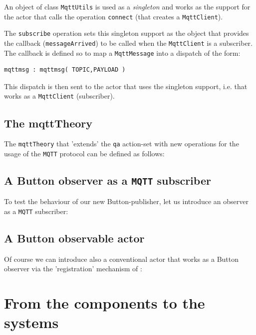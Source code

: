 

An object of class \texttt{MqttUtils} is used as a \textit{singleton} and works as the support for the actor that calls the operation \texttt{connect} (that creates a \texttt{MqttClient}).

The \texttt{subscribe} operation sets this singleton support as the object that provides the callback (\texttt{messageArrived}) to be called when the \texttt{MqttClient} is a subscriber. The callback is defined so to map a \texttt{MqttMessage} into a dispatch of the form:

\begin{Verbatim}[fontsize=\scriptsize, frame=single]
mqttmsg : mqttmsg( TOPIC,PAYLOAD )
\end{Verbatim}

This dispatch is then sent to the actor that uses the singleton support, i.e. that works as a \texttt{MqttClient} (subscriber).

\subsection{The mqttTheory}
The \texttt{mqttTheory} that 'extends' the \texttt{qa} action-set with new operations for the usage of the \texttt{MQTT} protocol can be defined as follows:





\subsection{A Button observer as a \texttt{MQTT} subscriber}
To test the behaviour of our new Button-publisher, let us introduce an observer as a \texttt{MQTT} subscriber:



\subsection{A Button observable actor} 
Of course we can introduce also a conventional actor that works as a Button observer via the 'registration' mechanism of :






\newpage 
\section{From the components to the systems}




 